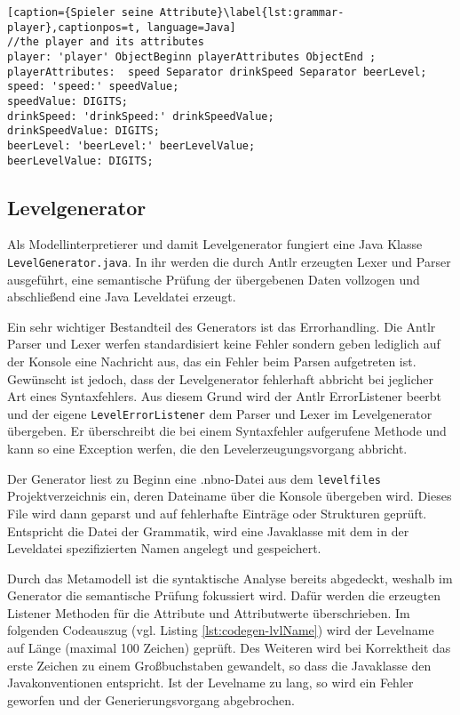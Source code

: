\begin{lstlisting}[caption={Spieler seine Attribute}\label{lst:grammar-player},captionpos=t, language=Java] 
//the player and its attributes
player: 'player' ObjectBeginn playerAttributes ObjectEnd ;
playerAttributes:  speed Separator drinkSpeed Separator beerLevel;
speed: 'speed:' speedValue;
speedValue: DIGITS;
drinkSpeed: 'drinkSpeed:' drinkSpeedValue;
drinkSpeedValue: DIGITS;
beerLevel: 'beerLevel:' beerLevelValue;
beerLevelValue: DIGITS;
\end{lstlisting}

\subsection{Levelgenerator}

Als Modellinterpretierer und damit Levelgenerator fungiert eine Java Klasse \texttt{LevelGenerator.java}. In ihr werden die durch Antlr erzeugten Lexer und Parser ausgeführt, eine semantische Prüfung der übergebenen Daten vollzogen und abschließend eine Java Leveldatei erzeugt.

Ein sehr wichtiger Bestandteil des Generators ist das Errorhandling. Die Antlr Parser und Lexer werfen standardisiert keine Fehler sondern geben lediglich auf der Konsole eine Nachricht aus, das ein Fehler beim Parsen aufgetreten ist. Gewünscht ist jedoch, dass der Levelgenerator fehlerhaft abbricht bei jeglicher Art eines Syntaxfehlers. Aus diesem Grund wird der Antlr ErrorListener beerbt und der eigene \texttt{LevelErrorListener} dem Parser und Lexer im Levelgenerator übergeben. Er überschreibt die bei einem Syntaxfehler aufgerufene Methode und kann so eine Exception werfen, die den Levelerzeugungsvorgang abbricht.

Der Generator liest zu Beginn eine .nbno-Datei aus dem \texttt{levelfiles} Projektverzeichnis ein, deren Dateiname über die Konsole übergeben wird. Dieses File wird dann geparst und auf fehlerhafte Einträge oder Strukturen geprüft. Entspricht die Datei der Grammatik, wird eine Javaklasse mit dem in der Leveldatei spezifizierten Namen angelegt und gespeichert.

Durch das Metamodell ist die syntaktische Analyse bereits abgedeckt, weshalb im Generator die semantische Prüfung fokussiert wird. Dafür werden die erzeugten Listener Methoden für die Attribute und Attributwerte überschrieben. Im folgenden Codeauszug (vgl. Listing \ref{lst:codegen-lvlName}) wird der Levelname auf Länge (maximal 100 Zeichen) geprüft. Des Weiteren wird bei Korrektheit das erste Zeichen zu einem Großbuchstaben gewandelt, so dass die Javaklasse den Javakonventionen entspricht. Ist der Levelname zu lang, so wird ein Fehler geworfen und der Generierungsvorgang abgebrochen.

